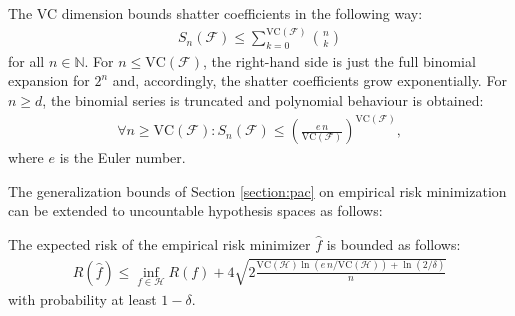     \begin{property}\label{data:sauer_lemma}
        The VC dimension bounds shatter coefficients in the following way:
        \begin{gather}
            S_n(\mathcal{F})\leq\sum_{k=0}^{\mathrm{VC}(\mathcal{F})}\binom{n}{k}
        \end{gather}
        for all $n\in\mathbb{N}$. For $n\leq\mathrm{VC}(\mathcal{F})$, the right-hand side is just the full binomial expansion for $2^n$ and, accordingly, the shatter coefficients grow exponentially. For $n\geq d$, the binomial series is truncated and polynomial behaviour is obtained:
        \begin{gather}
            \forall n\geq\mathrm{VC}(\mathcal{F}):S_n(\mathcal{F})\leq\left(\frac{e\,n}{\mathrm{VC}(\mathcal{F})}\right)^{\mathrm{VC}(\mathcal{F})},
        \end{gather}
        where $e$ is the Euler number.
    \end{property}

    The generalization bounds of Section \ref{section:pac} on empirical risk minimization can be extended to uncountable hypothesis spaces as follows:
    \begin{property}
        The expected risk of the empirical risk minimizer $\hat{f}$ is bounded as follows:
        \begin{gather}
            R(\hat{f})\leq\inf_{f\in\mathcal{H}}R(f)+4\sqrt{2\frac{\mathrm{VC}(\mathcal{H})\ln(e\,n/\mathrm{VC}(\mathcal{H})) + \ln(2/\delta)}{n}}
        \end{gather}
        with probability at least $1-\delta$.
    \end{property}

